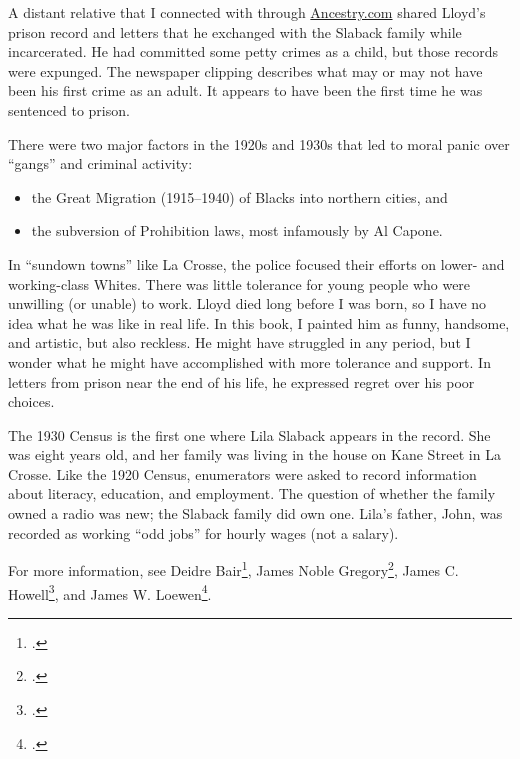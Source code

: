 \documentclass[
  letterpaper,
]{book}
\providecommand{\tightlist}{%
  \setlength{\itemsep}{0pt}\setlength{\parskip}{0pt}}\usepackage{longtable,booktabs,array}
\begin{document}
A distant relative that I connected with through
\href{https://www.ancestry.com/}{Ancestry.com} shared Lloyd's prison
record and letters that he exchanged with the Slaback family while
incarcerated. He had committed some petty crimes as a child, but those
records were expunged. The newspaper clipping describes what may or may
not have been his first crime as an adult. It appears to have been the
first time he was sentenced to prison.

There were two major factors in the 1920s and 1930s that led to moral
panic over ``gangs'' and criminal activity:

\begin{itemize}
\tightlist
\item
  the Great Migration (1915--1940) of Blacks into northern cities, and
\item
  the subversion of Prohibition laws, most infamously by Al Capone.
\end{itemize}

In ``sundown towns'' like La Crosse, the police focused their efforts on
lower- and working-class Whites. There was little tolerance for young
people who were unwilling (or unable) to work. Lloyd died long before I
was born, so I have no idea what he was like in real life. In this book,
I painted him as funny, handsome, and artistic, but also reckless. He
might have struggled in any period, but I wonder what he might have
accomplished with more tolerance and support. In letters from prison
near the end of his life, he expressed regret over his poor choices.

The 1930 Census is the first one where Lila Slaback appears in the
record. She was eight years old, and her family was living in the house
on Kane Street in La Crosse. Like the 1920 Census, enumerators were
asked to record information about literacy, education, and employment.
The question of whether the family owned a radio was new; the Slaback
family did own one. Lila's father, John, was recorded as working ``odd
jobs'' for hourly wages (not a salary).

For more information, see Deidre Bair\footnote{.},
James Noble Gregory\footnote{.}, James C. Howell\footnote{.}, and
James W. Loewen\footnote{.}.
\end{document}
